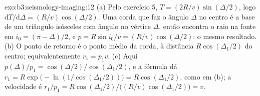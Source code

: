 \begin{solution}{exo:b3:seismology-imaging:12}
(a) Pelo exercício 5, $T = (2R/v)\sin(\Delta/2)$, logo $\mathrm dT/\mathrm d\Delta
= (R/v)\cos(\Delta/2)$. Uma corda que faz o ângulo $\Delta$ no centro é a
base de um triângulo isósceles com ângulo no vértice $\Delta$, então encontra o raio
na fonte em $i_0 = (\pi - \Delta)/2$, e $p = R\sin i_0/v =
(R/v)\cos(\Delta/2)$: o mesmo resultado. (b) O ponto de retorno é o ponto médio da
corda, à distância $R\cos(\Delta_1/2)$ do centro; equivalentemente
$r_1 = p_1v$. (c) Aqui $p(\Delta)/p_1 = \cos(\Delta/2)/\cos(\Delta_1/2)$, e
a fórmula dá $r_1 = R\exp\bigl(-\ln(1/\cos(\Delta_1/2))\bigr) =
R\cos(\Delta_1/2)$, como em (b); a velocidade é $r_1/p_1 = R\cos(\Delta_1/2)\big/
\bigl((R/v)\cos(\Delta_1/2)\bigr) = v$.
\end{solution}

